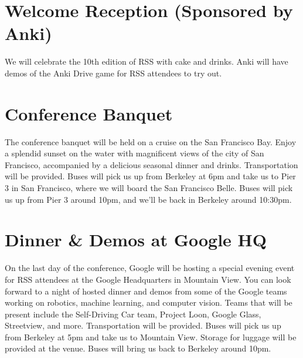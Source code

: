 \section*{Welcome Reception (Sponsored by Anki)}

We will celebrate the 10th edition of RSS with cake and drinks. Anki will have demos of the Anki Drive game for RSS attendees to try out.

\vspace{3mm}
\section*{Conference Banquet}
The conference banquet will be held on a cruise on the San Francisco Bay. Enjoy a splendid sunset on the water with magnificent views of the city of San Francisco, accompanied by a delicious seasonal dinner and drinks. Transportation will be provided. Buses will pick us up from Berkeley at 6pm and take us to Pier 3 in San Francisco, where we will board the San Francisco Belle. Buses will pick us up from Pier 3 around 10pm, and we'll be back in Berkeley around 10:30pm.

\vspace{3mm}
\section*{Dinner \& Demos at Google HQ}
On the last day of the conference, Google will be hosting a special evening event for RSS attendees at the Google Headquarters in Mountain View. You can look forward to a night of hosted dinner and demos from some of the Google teams working on robotics, machine learning, and computer vision. Teams that will be present include the Self-Driving Car team, Project Loon, Google Glass, Streetview, and more. Transportation will be provided. Buses will pick us up from Berkeley at 5pm and take us to Mountain View. Storage for luggage will be provided at the venue. Buses will bring us back to Berkeley around 10pm.


\setlength\fboxrule{0pt}



